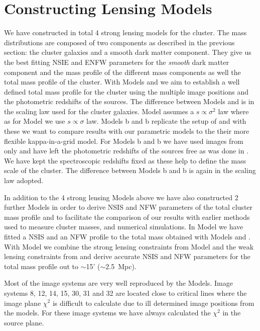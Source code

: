 \documentclass[useAMS,usenatbib]{mn2e}
\newcounter{one}   \setcounter{one}{1}
\newcounter{two}   \setcounter{two}{2}
\newcounter{three} \setcounter{three}{3}
\newcounter{four}  \setcounter{four}{4}
\begin{document}
\section{Constructing Lensing Models}
\label{sec:result}

We have constructed in total 4 strong lensing models for the cluster.
The mass distributions are composed of two components as described in
the previous section: the cluster galaxies and a smooth dark matter
component. They give us the best fitting NSIE and ENFW parameters for
the {\it smooth} dark matter component and the mass profile of the
different mass components as well the total mass profile of the
cluster. With Models  and  we aim to establish a
well defined total mass profile for the cluster using the multiple
image positions and the photometric redshifts of the sources. The
difference between Models  and  is in the
scaling law used for the cluster galaxies. Model  assumes a
$s \propto \sigma^2$ law where as for Model  we use $s
\propto \sigma$ law. Models \mbox{b} and
\mbox{b} replicate the setup of \citet{broadhurst:05} and
with these we want to compare results with our parametric models to
the their more flexible kappa-in-a-grid model. For Models
\mbox{b} and \mbox{b} we have used images from
\citet{broadhurst:05} only and have left the photometric redshifts of
the sources free as was done in \citet{broadhurst:05}. We have kept
the spectroscopic redshifts fixed as these help to define the mass
scale of the cluster. The difference between Models
\mbox{b} and \mbox{b} is again in the scaling
law adopted.

In addition to the 4 strong lensing Models above we have also
constructed 2 further Models in order to derive NSIS and NFW
parameters of the total cluster mass profile and to facilitate the
comparison of our results with earlier methods used to measure cluster
masses, and numerical simulations. In Model  we have
fitted a NSIS and an NFW profile to the total mass obtained with
Models  and . With Model  we combine
the strong lensing constraints from Model  and the weak
lensing constraints from \citet{broadhurst:05b} and derive accurate
NSIS and NFW parameters for the total mass profile out to $\sim$15'
($\sim$2.5~Mpc).

Most of the image systems are very well reproduced by the
Models. Image systems 8, 12, 14, 15, 30, 31 and 32 are located close
to critical lines where the image plane $\chi^2$ is difficult to
calculate due to ill determined image positions from the models. For
these image systems we have always calculated the $\chi^2$ in the
source plane.
\end{document}
